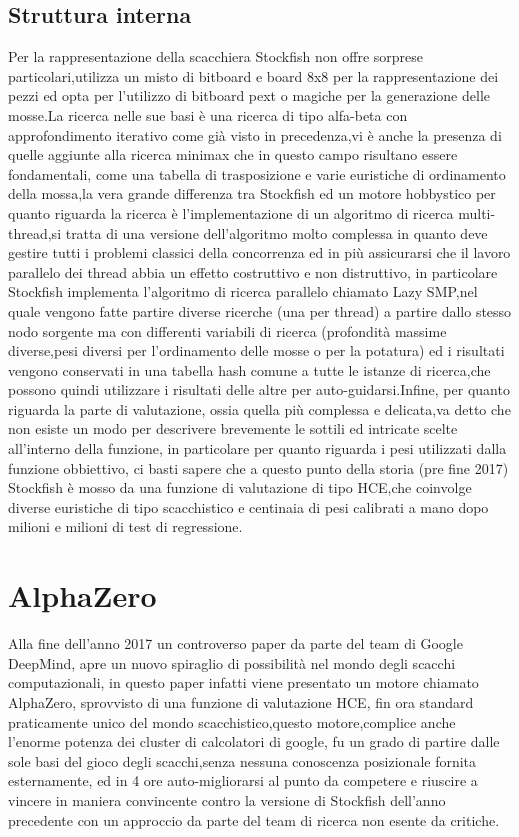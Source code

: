 \subsection{Struttura interna}
Per la rappresentazione della scacchiera Stockfish non offre sorprese particolari,utilizza un misto di bitboard e board 8x8 per la rappresentazione dei pezzi ed opta per l'utilizzo di bitboard pext
o magiche per la generazione delle mosse.La ricerca nelle sue basi è una ricerca di tipo alfa-beta con approfondimento iterativo come già visto in precedenza,vi è anche la presenza di quelle 
aggiunte alla ricerca minimax che in questo campo risultano essere fondamentali, come una tabella di trasposizione e varie euristiche di ordinamento della mossa,la vera grande differenza
tra Stockfish ed un motore hobbystico per quanto riguarda la ricerca è l'implementazione di un algoritmo di ricerca multi-thread,si tratta di una versione dell'algoritmo molto complessa in quanto deve
gestire tutti i problemi classici della concorrenza ed in più assicurarsi che il lavoro parallelo dei thread abbia un effetto costruttivo e non distruttivo, in particolare Stockfish implementa l'algoritmo di 
ricerca parallelo chiamato Lazy SMP,nel quale vengono fatte partire diverse ricerche (una per thread) a partire dallo stesso nodo sorgente ma con differenti variabili di ricerca (profondità massime diverse,pesi 
diversi per l'ordinamento delle mosse o per la potatura) ed i risultati vengono conservati in una tabella hash comune a tutte le istanze di ricerca,che possono quindi utilizzare i risultati delle altre per 
auto-guidarsi.Infine, per quanto riguarda la parte di valutazione, ossia quella più complessa e delicata,va detto che non esiste un modo per descrivere brevemente le sottili ed intricate scelte all'interno 
della funzione, in particolare per quanto riguarda i pesi utilizzati dalla funzione obbiettivo, ci basti sapere che a questo punto della storia (pre fine 2017) Stockfish è mosso da una funzione di valutazione 
di tipo HCE,che coinvolge diverse euristiche di tipo scacchistico e centinaia di pesi calibrati a mano dopo milioni e milioni di test di regressione.


\section{AlphaZero}
Alla fine dell'anno 2017 un controverso paper\cite{DBLP:journals/corr/abs-1712-01815} da parte del team di Google DeepMind, apre un nuovo spiraglio di possibilità nel mondo degli scacchi computazionali,
in questo paper infatti viene presentato un motore chiamato AlphaZero, sprovvisto di una funzione di valutazione HCE, fin ora standard praticamente unico del mondo scacchistico,questo motore,complice anche l'enorme 
potenza dei cluster di calcolatori di google, fu un grado di partire dalle sole basi del gioco degli scacchi,senza nessuna conoscenza posizionale fornita esternamente, ed in 4 ore auto-migliorarsi al punto 
da competere e riuscire a vincere in maniera convincente contro la versione di Stockfish dell'anno precedente con un approccio da parte del team di ricerca non esente da critiche\cite{chess.com}.



